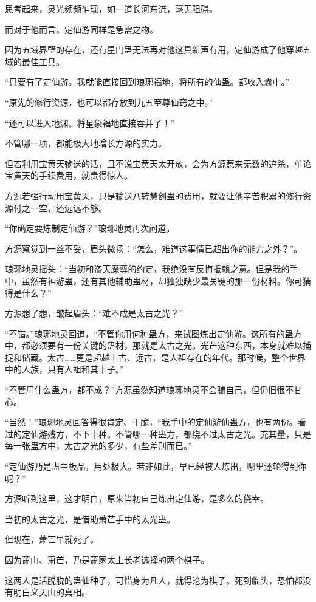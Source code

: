 \begin{this_body}
思考起来，灵光频频乍现，如一道长河东流，毫无阻碍。

而对于他而言。定仙游同样是急需之物。

因为五域界壁的存在，还有星门蛊无法再对他这具新声有用，定仙游成了他穿越五域的最佳工具。

“只要有了定仙游。我就能直接回到琅琊福地，将所有的仙蛊。都收入囊中。”

“原先的修行资源，也可以都存放到九五至尊仙窍之中。”

“还可以进入地渊。将星象福地直接吞并了！”

不管哪一项，都能极大地增长方源的实力。

但若利用宝黄天输送的话，且不说宝黄天太开放，会为方源惹来无数的追杀，单论宝黄天的手续费用，就贵得惊人。

方源若强行动用宝黄天，只是输送八转慧剑蛊的费用，就要让他辛苦积累的修行资源付之一空，还远远不够。

“你确定要炼制定仙游？”琅琊地灵再次问道。

方源察觉到一丝不妥，眉头微扬：“怎么，难道这事情已超出你的能力之外？”。

琅琊地灵摇头：“当初和盗天魔尊的约定，我绝没有反悔抵赖之意。但是我的手中，虽然有神游蛊，还有其他辅助蛊材，却独独缺少最关键的那一份材料。你可猜得是什么？”

方源想了想，皱起眉头：“难不成是太古之光？”

“不错。”琅琊地灵回道，“不管你用何种蛊方，来试图炼出定仙游。这所有的蛊方中，都必须要有一份关键的蛊材，那就是太古之光。光芒这种东西，本身就难以捕捉和储藏。太古……更是超越上古、远古，是人祖存在的年代。那时候，整个世界中的人族，只有人祖和其十子。”

“不管用什么蛊方，都不成？”方源虽然知道琅琊地灵不会骗自己，但仍旧很不甘心。

“当然！”琅琊地灵回答得很肯定、干脆，“我手中的定仙游仙蛊方，也有两份。看过的定仙游残方，不下十种。不管哪一种蛊方，都绕不过太古之光。充其量，只是每一张蛊方中，太古之光的多少，有些差别而已。”

“定仙游乃是蛊中极品，用处极大。若非如此，早已经被人炼出，哪里还轮得到你呢？”

方源听到这里，这才明白，原来当初自己炼出定仙游，是多么的侥幸。

当初的太古之光，是借助萧芒手中的太光蛊。

但现在，萧芒早就死了。

因为萧山、萧芒，乃是萧家太上长老选择的两个棋子。

这两人是活脱脱的蛊仙种子，可惜身为凡人，就得沦为棋子。死到临头，恐怕都没有明白义天山的真相。


\end{this_body}

